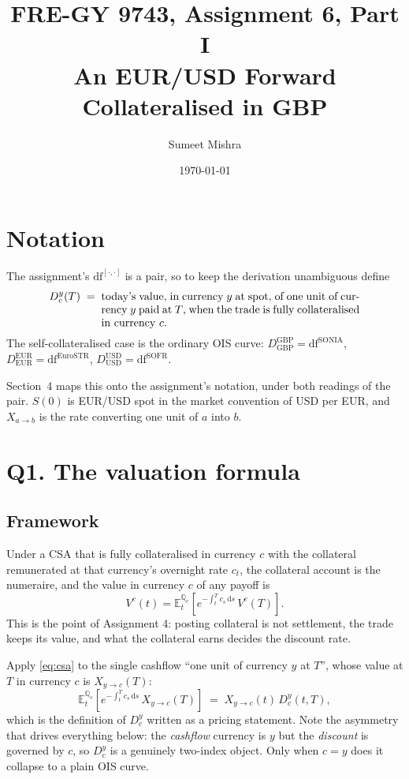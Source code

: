 \documentclass[11pt]{article}
\title{FRE-GY 9743, Assignment 6, Part I\\[2pt]\large An EUR/USD Forward
Collateralised in GBP}
\author{Sumeet Mishra}
\date{\today}
\newcommand{\D}[2]{D_{#1}^{#2}}
\newcommand{\Ec}[2]{\mathbb{E}^{\mathbb{Q}_{#1}}_{t}\!\left[#2\right]}
\begin{document}
\maketitle

\section*{Notation}

The assignment's $\mathrm{df}^{[\cdot,\cdot]}$ is a pair, so to keep the derivation
unambiguous define
\[
  \D{c}{y}(T) \;=\;
  \begin{minipage}[t]{0.68\textwidth}
  today's value, in currency $y$ at spot, of one unit of currency $y$ paid at $T$,
  when the trade is fully collateralised in currency $c$.
  \end{minipage}
\]
The self-collateralised case is the ordinary OIS curve:
$\D{\mathrm{GBP}}{\mathrm{GBP}} = \mathrm{df}^{\mathrm{SONIA}}$,
$\D{\mathrm{EUR}}{\mathrm{EUR}} = \mathrm{df}^{\mathrm{EuroSTR}}$,
$\D{\mathrm{USD}}{\mathrm{USD}} = \mathrm{df}^{\mathrm{SOFR}}$.

Section~4 maps this onto the assignment's notation, under both readings of the pair.
$S(0)$ is EUR/USD spot in the market convention of USD per EUR, and $X_{a\to b}$ is the
rate converting one unit of $a$ into $b$.

\section{Q1. The valuation formula}

\subsection{Framework}

Under a CSA that is fully collateralised in currency $c$ with the collateral remunerated
at that currency's overnight rate $c_t$, the collateral account is the numeraire, and the
value in currency $c$ of any payoff is
\begin{equation}
  V^c(t) = \Ec{c}{e^{-\int_t^T c_s\,\mathrm{d}s}\,V^c(T)}.
  \label{eq:csa}
\end{equation}
This is the point of Assignment 4: posting collateral is not settlement, the trade keeps
its value, and what the collateral earns decides the discount rate.

Apply \eqref{eq:csa} to the single cashflow ``one unit of currency $y$ at $T$'', whose
value at $T$ in currency $c$ is $X_{y\to c}(T)$:
\begin{equation}
  \Ec{c}{e^{-\int_t^T c_s\,\mathrm{d}s}\,X_{y\to c}(T)}
  \;=\; X_{y\to c}(t)\,\D{c}{y}(t,T),
  \label{eq:defD}
\end{equation}
which is the definition of $\D{c}{y}$ written as a pricing statement. Note the asymmetry
that drives everything below: the \emph{cashflow} currency is $y$ but the \emph{discount}
is governed by $c$, so $\D{c}{y}$ is a genuinely two-index object. Only when $c=y$ does it
collapse to a plain OIS curve.
\end{document}
